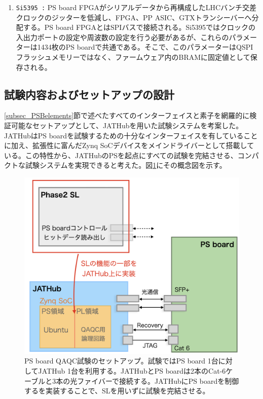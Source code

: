 \begin{enumerate}
    \item \texttt{Si5395 :} PS board FPGAがシリアルデータから再構成したLHCバンチ交差クロックのジッターを低減し、FPGA、PP ASIC、GTXトランシーバーへ分配する。PS board FPGAとはSPIバスで接続される。Si5395ではクロックの入出力ポートの設定や周波数の設定を行う必要があるが、これらのパラメーターは1434枚のPS boardで共通である。そこで、このパラメーターはQSPIフラッシュメモリーではなく、ファームウェア内のBRAMに固定値として保存される。
    \baselineskip

\end{enumerate}

\subsection{試験内容およびセットアップの設計}
\label{subsec_QAQCdesign}
\ref{subsec_PSBelements}節で述べたすべてのインターフェイスと素子を網羅的に検証可能なセットアップとして、JATHubを用いた試験システムを考案した。JATHubはPS boardを試験するための十分なインターフェイスを有していることに加え、拡張性に富んだZynq SoCデバイスをメインドライバーとして搭載している。この特性から、JATHubのPSを起点にすべての試験を完結させる、コンパクトな試験システムを実現できると考えた。図\ref{PSBtestdesign}にその概念図を示す。

\begin{figure} 
\centering
\includegraphics[width=16cm]{fig/QAQC/PSBtestdesign.png}
\caption[PS board QAQC試験セットアップ]{PS board QAQC試験のセットアップ。試験ではPS board 1台に対してJATHub 1台を利用する。JATHubとPS boardは2本のCat-6ケーブルと3本の光ファイバーで接続する。JATHubにPS boardを制御するを実装することで、SLを用いずに試験を完結させる。}
\label{PSBtestdesign}
\end{figure}

